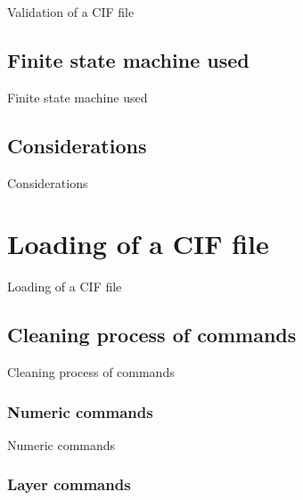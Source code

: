 \documentclass[11pt,twoside,openany,x11names,svgnames]{memoir}
\begin{document}
Validation of a CIF file

\subsection{Finite state machine used}\label{Finite-state-machine-used}

Finite state machine used

\subsection{Considerations}\label{Considerations}

Considerations

\section{Loading of a CIF file}\label{Loading-of-a-CIF-file}

Loading of a CIF file

\subsection{Cleaning process of commands}\label{Cleaning-process-of-commands}

Cleaning process of commands

\subsubsection{Numeric commands}\label{Numeric-commands}

Numeric commands

\subsubsection{Layer commands}\label{Layer-commands}
\end{document}
